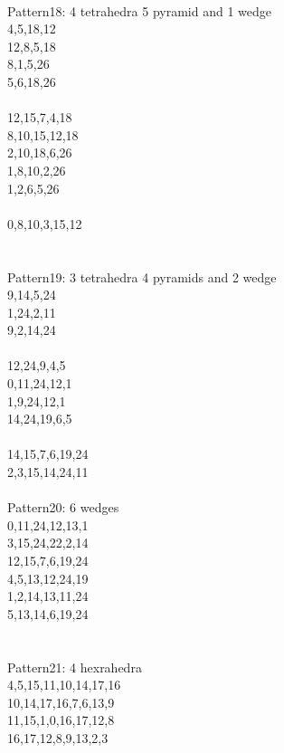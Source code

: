 \documentclass[twocolumn]{article}
\begin{document}
 \\
\tiny  Pattern18: 4 tetrahedra 5 pyramid and 1 wedge\\
\tiny  4,5,18,12\\
\tiny  12,8,5,18 \\
\tiny  8,1,5,26 \\
\tiny  5,6,18,26 \\
\tiny   \\
\tiny  12,15,7,4,18 \\
\tiny  8,10,15,12,18 \\
\tiny  2,10,18,6,26 \\
\tiny  1,8,10,2,26\\
\tiny  1,2,6,5,26\\
\tiny   \\
\tiny  0,8,10,3,15,12 \\
    \\

 \\
\tiny  Pattern19: 3 tetrahedra 4 pyramids and 2 wedge\\
\tiny  9,14,5,24 \\
\tiny  1,24,2,11 \\
\tiny  9,2,14,24 \\
\tiny   \\
\tiny  12,24,9,4,5 \\
\tiny  0,11,24,12,1 \\
\tiny  1,9,24,12,1 \\
\tiny  14,24,19,6,5 \\
\tiny   \\
\tiny  14,15,7,6,19,24 \\
\tiny  2,3,15,14,24,11 \\

 \\
\tiny  Pattern20: 6 wedges\\
\tiny  0,11,24,12,13,1 \\
\tiny  3,15,24,22,2,14  \\
\tiny  12,15,7,6,19,24 \\
\tiny  4,5,13,12,24,19 \\
\tiny  1,2,14,13,11,24 \\
\tiny  5,13,14,6,19,24 \\
\tiny   \\

 \\
\tiny  Pattern21: 4 hexrahedra \\
\tiny  4,5,15,11,10,14,17,16 \\
\tiny  10,14,17,16,7,6,13,9 \\
\tiny  11,15,1,0,16,17,12,8 \\
\tiny  16,17,12,8,9,13,2,3 \\
\tiny   \\
\end{document}
